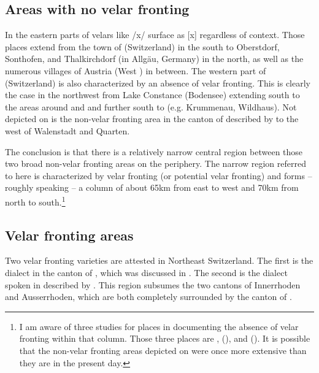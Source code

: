 \clearpage
\subsection{Areas with no velar fronting} 
In the eastern parts of  velars like /x/ surface as [x] regardless of context. Those places extend from the town of  (Switzerland) in the south to Oberstdorf, Sonthofen, and Thalkirchdorf (in Allgäu, Germany) in the north, as well as the numerous villages of Austria (West ) in between. The western part of  (Switzerland) is also characterized by an absence of velar fronting. This is clearly the case in the northwest from Lake Constance (Bodensee) extending south to the areas around  and  and further south to  (e.g. Krummenau, Wildhaus). Not depicted on  is the non-velar fronting area in the canton of  described by \citet{Streiff1915} to the west of Walenstadt and Quarten.

The conclusion is that there is a relatively narrow central region between those two broad non-velar fronting areas on the periphery. The narrow region referred to here is characterized by velar fronting (or potential velar fronting) and forms -- roughly speaking -- a column of about 65km from east to west and 70km from north to south.\footnote{{I am aware of three studies for places in  documenting the absence of velar fronting within that column. Those three places are  \citep{Seemüller1909c},  (\citealt{SchneiderMarte1910}), and  (\citealt{SchneiderMarte1910}). It is possible that the non-velar fronting areas depicted on  were once more extensive than they are in the present day.} }

\subsection{Velar fronting areas} 
Two velar fronting varieties are attested in Northeast Switzerland. The first is the  dialect in the canton of  \citep{Berger1913}, which was discussed in . The second is the dialect spoken in  described by \citet{Vetsch1910}. This region subsumes the two cantons of  Innerrhoden and  Ausserrhoden, which are both completely surrounded by the canton of .\largerpage


